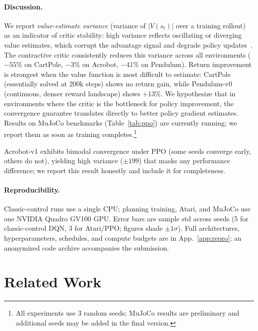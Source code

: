 \documentclass{article}
\begin{document}
\paragraph{Discussion.}
We report \emph{value-estimate variance} (variance of $|V(s_t)|$ over a training
rollout) as an indicator of critic stability: high variance reflects oscillating
or diverging value estimates, which corrupt the advantage signal and degrade
policy updates~\citep{fujimoto2018addressing}.
The contractive critic consistently reduces this variance across all environments
($-55\%$ on CartPole, $-3\%$ on Acrobot, $-41\%$ on Pendulum).
Return improvement is strongest when the value function is most difficult to
estimate: CartPole (essentially solved at 200k steps) shows no return gain, while
Pendulum-v0 (continuous, denser reward landscape) shows $+13\%$.
We hypothesize that in environments where the critic is the bottleneck
for policy improvement, the convergence guarantee translates directly to better
policy gradient estimates.
Results on MuJoCo benchmarks (Table~\ref{tab:ppo}) are currently running;
we report them as soon as training completes.\footnote{%
  All experiments use 3 random seeds; MuJoCo results are preliminary and
  additional seeds may be added in the final version.}

Acrobot-v1 exhibits bimodal convergence under PPO (some seeds converge early,
others do not), yielding high variance ($\pm 199$) that masks any performance
difference; we report this result honestly and include it for completeness.

\paragraph{Reproducibility.}
\label{par:reproducibility}
Classic-control runs use a single CPU; planning training, Atari, and MuJoCo
use one NVIDIA Quadro GV100 GPU.
Error bars are sample std across seeds (5 for classic-control DQN, 3 for
Atari/PPO; figures shade $\pm 1\sigma$).
Full architectures, hyperparameters, schedules, and compute budgets are in
App.~\ref{app:repro}; an anonymized code archive accompanies the submission.

\section{Related Work}
\label{sec:related}
\end{document}
